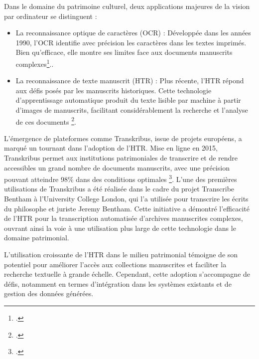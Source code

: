 \documentclass[a4paper,12pt,twoside]{book}
\begin{document}
Dans le domaine du patrimoine culturel, deux applications majeures de la vision par ordinateur se distinguent :
\\

\begin{itemize}
	\item La reconnaissance optique de caractères (OCR) : Développée dans les années 1990, l'OCR identifie avec précision les caractères dans les textes imprimés. Bien qu'efficace, elle montre ses limites face aux documents manuscrits complexes\footcite{nockels_gooding_ames_terras_2022}..
	
	\item La reconnaissance de texte manuscrit (HTR) :  Plus récente, l'HTR répond aux défis posés par les manuscrits historiques. Cette technologie d'apprentissage automatique produit du texte lisible par machine à partir d'images de manuscrits, facilitant considérablement la recherche et l'analyse de ces documents \footcite{nockels_gooding_ames_terras_2022}.
\end{itemize}

L'émergence de plateformes comme Transkribus, issue de projets européens, a marqué un tournant dans l'adoption de l'HTR. Mise en ligne en 2015, Transkribus permet aux institutions patrimoniales de transcrire et de rendre accessibles un grand nombre de documents manuscrits, avec une précision pouvant atteindre 98\% dans des conditions optimales \footcite{terras_role_2022}. L’une des premières utilisations de Transkribus a été réalisée dans le cadre du projet Transcribe Bentham à l’University College London, qui l’a utilisée pour transcrire les écrits du philosophe et juriste Jeremy Bentham. Cette initiative a démontré l’efficacité de l’HTR pour la transcription automatisée d’archives manuscrites complexes, ouvrant ainsi la voie à une utilisation plus large de cette technologie dans le domaine patrimonial.

L'utilisation croissante de l'HTR dans le milieu patrimonial témoigne de son potentiel pour améliorer l'accès aux collections manuscrites et faciliter la recherche textuelle à grande échelle. Cependant, cette adoption s'accompagne de défis, notamment en termes d'intégration dans les systèmes existants et de gestion des données générées.
\\
\end{document}
